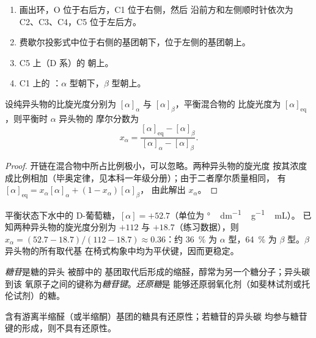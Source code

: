 \begin{method}\label{met:b2:biomolecules:haworth}
\begin{enumerate}
  \item 画出环，O 位于右后方，C1 位于右侧，然后
        沿前方和左侧顺时针依次为 C2、C3、C4，C5 位于左后方。
  \item 费歇尔投影式中位于右侧的基团朝下，位于左侧的基团朝上。
  \item C5 上（D 系）的  朝上。
  \item C1 上的 ：$\alpha$ 型朝下，$\beta$ 型朝上。
\end{enumerate}
\end{method}

\begin{proposition}[变旋平衡]\label{prop:b2:biomolecules:mutarotation}
设纯异头物的比旋光度分别为 $[\alpha]_\alpha$ 与 $[\alpha]_\beta$，平衡混合物的
比旋光度为 $[\alpha]_{\mathrm{eq}}$，则平衡时 $\alpha$ 异头物的
摩尔分数为
\begin{equation*}
x_\alpha = \frac{[\alpha]_{\mathrm{eq}} - [\alpha]_\beta}{[\alpha]_\alpha - [\alpha]_\beta}.
\end{equation*}
\end{proposition}

\begin{proof}
开链在混合物中所占比例极小，可以忽略。两种异头物的旋光度
按其浓度成比例相加（毕奥定律，见本科一年级分册）；由于二者摩尔质量相同，
有 $[\alpha]_{\mathrm{eq}} = x_\alpha[\alpha]_\alpha + (1 - x_\alpha)[\alpha]_\beta$，
由此解出 $x_\alpha$。
\end{proof}

平衡状态下水中的 D-葡萄糖，$[\alpha] = +52.7$（单位为 \unit{\degree\,dm^{-1}\,g^{-1}\,mL}）。
已知两种异头物的旋光度分别为 $+112$ 与 $+18.7$（练习数据），则 $x_\alpha = (52.7 - 18.7)/(112 - 18.7)
\approx 0.36$：约 36~\% 为 $\alpha$ 型，64~\% 为 $\beta$ 型。$\beta$ 异头物的所有取代基
在椅式构象中均为平伏键，因而更稳定。

\begin{definition}[糖苷]\label{def:b2:biomolecules:glycoside}
\emph{糖苷}是糖的异头 
被醇中的  基团取代后形成的缩醛，醇常为另一个糖分子；异头碳到该
氧原子之间的键称为\emph{糖苷键}。\emph{还原糖}是
能够还原弱氧化剂（如斐林试剂或托伦试剂）的糖。
\end{definition}

\begin{proposition}[是否具有还原性]\label{prop:b2:biomolecules:reducing}
含有游离半缩醛（或半缩酮）基团的糖具有还原性；若糖苷的异头碳
均参与糖苷键的形成，则不具有还原性。
\end{proposition}

